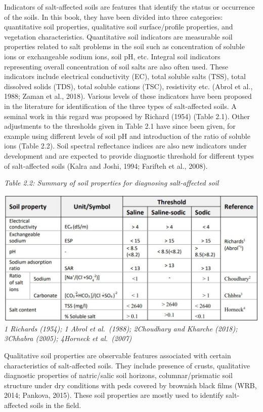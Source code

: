 \documentclass[
  10pt,
  b5paper,
]{book}
\begin{document}
Indicators of salt-affected soils are features that identify the status or occurrence of the soils. In this book, they have been divided into three categories: quantitative soil properties, qualitative soil surface/profile properties, and vegetation characteristics.
Quantitative soil indicators are measurable soil properties related to salt problems in the soil such as concentration of soluble ions or exchangeable sodium ions, soil pH, etc. Integral soil indicators representing overall concentration of soil salts are also often used. These indicators include electrical conductivity (EC), total soluble salts (TSS), total dissolved solids (TDS), total soluble cations (TSC), resistivity etc. (Abrol et al., 1988; Zaman et al., 2018). Various levels of these indicators have been proposed in the literature for identification of the three types of salt-affected soils. A seminal work in this regard was proposed by Richard (1954) (Table 2.1). Other adjustments to the thresholds given in Table 2.1 have since been given, for example using different levels of soil pH and introduction of the ratio of soluble ions (Table 2.2). Soil spectral reflectance indices are also new indicators under development and are expected to provide diagnostic threshold for different types of salt-affected soils (Kalra and Joshi, 1994; Farifteh et al., 2008).

\emph{Table 2.2: Summary of soil properties for diagnosing salt-affected soil}

\includegraphics{figures/tables/Table_2.2.jpg}
\emph{1 Richards (1954); 1 Abrol et al.~(1988); 2Choudhary and Kharche (2018); 3Chhabra (2005); 4Horneck et al.~(2007)}

Qualitative soil properties are observable features associated with certain characteristics of salt-affected
soils. They include presence of crusts, qualitative diagnostic properties of natric/salic soil horizons, columnar/prismatic soil structure under dry conditions with peds covered by brownish black films (WRB,
2014; Pankova, 2015). These soil properties are mostly used to identify salt-affected soils in the field.
\end{document}
